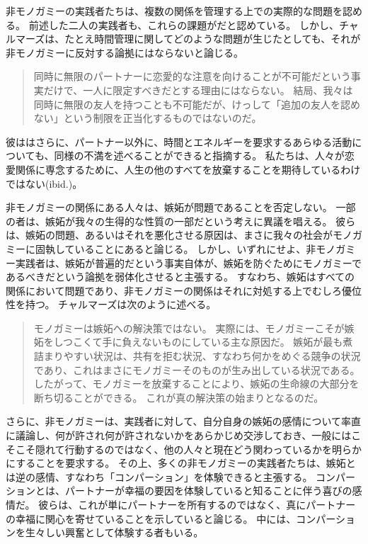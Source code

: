 \documentclass[paper=a4,book,openany]{jlreq} \usepackage{mystyle}
\begin{document}
非モノガミーの実践者たちは、複数の関係を管理する上での実際的な問題を認める。
前述した二人の実践者も、これらの課題がだと認めている。
しかし、チャルマーズは、たとえ時間管理に関してどのような問題が生じたとしても、それが非モノガミーに反対する論拠にはならないと論じる。

\begin{quote}
同時に無限のパートナーに恋愛的な注意を向けることが不可能だという事実だけで、一人に限定すべきだとする理由にはならない。
結局、我々は同時に無限の友人を持つことも不可能だが、けっして「追加の友人を認めない」という制限を正当化するものではないのだ。
\citep[p.232]{chalmers19:_is_monog_moral_permis}

\end{quote}

彼ははさらに、パートナー以外に、時間とエネルギーを要求するあらゆる活動についても、同様の不満を述べることができると指摘する。
私たちは、人々が恋愛関係に専念するために、人生の他のすべてを放棄することを期待しているわけではない(ibid.)。

非モノガミーの関係にある人々は、嫉妬が問題であることを否定しない。
一部の者は、嫉妬が我々の生得的な性質の一部だという考えに異議を唱える。
彼らは、嫉妬の問題、あるいはそれを悪化させる原因は、まさに我々の社会がモノガミーに固執していることにあると論じる。
しかし、いずれにせよ、非モノガミー実践者は、嫉妬が普遍的だという事実自体が、嫉妬を防ぐためにモノガミーであるべきだという論拠を弱体化させると主張する。
すなわち、嫉妬はすべての関係において問題であり、非モノガミーの関係はそれに対処する上でむしろ優位性を持つ。
チャルマーズは次のように述べる。

\begin{quote}
モノガミーは嫉妬への解決策ではない。
実際には、モノガミーこそが嫉妬をしつこくて手に負えないものにしている主な原因だ。
嫉妬が最も煮詰まりやすい状況は、共有を拒む状況、すなわち何かをめぐる競争の状況であり、これはまさにモノガミーそのものが生み出している状況である。
したがって、モノガミーを放棄することにより、嫉妬の生命線の大部分を断ち切ることができる。
これが真の解決策の始まりとなるのだ。
\citep[p.237]{chalmers19:_is_monog_moral_permis}
\end{quote}

さらに、非モノガミーは、実践者に対して、自分自身の嫉妬の感情について率直に議論し、何が許され何が許されないかをあらかじめ交渉しておき、一般にはこそこそ隠れて行動するのではなく、他の人々と現在どう関わっているかを明らかにすることを要求する。
その上、多くの非モノガミーの実践者たちは、嫉妬とは逆の感情、すなわち「コンパーション」を体験できると主張する。
コンパーションとは、パートナーが幸福の要因を体験していると知ることに伴う喜びの感情だ。
彼らは、これが単にパートナーを所有するのではなく、真にパートナーの幸福に関心を寄せていることを示していると論じる。
中には、コンパーションを生々しい興奮として体験する者もいる\citep{sousa18:_love_jealous_comper}。
\end{document}
